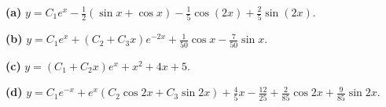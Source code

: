 \noindent\textbf{(a)} $y=C_1e^x-\tfrac12(\sin x+\cos x)-\tfrac15\cos(2x)+\tfrac25\sin(2x)$.

\noindent\textbf{(b)} $y=C_1e^x+(C_2+C_3x)e^{-2x}+\tfrac1{50}\cos x-\tfrac7{50}\sin x$.

\noindent\textbf{(c)} $y=(C_1+C_2x)e^x+x^2+4x+5$.

\noindent\textbf{(d)} $y=C_1e^{-x}+e^x(C_2\cos2x+C_3\sin2x)+\tfrac45x-\tfrac{12}{25}+\tfrac2{85}\cos2x+\tfrac9{85}\sin2x$.
